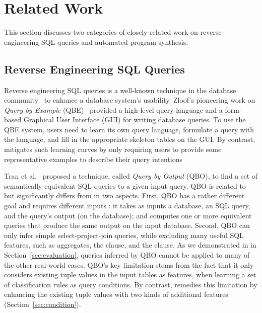
\section{Related Work}
\label{sec:related}

This section discusses two categories
of closely-related work on reverse engineering SQL queries 
and automated program synthesis.


\subsection{Reverse Engineering SQL Queries}

Reverse engineering SQL queries is a well-known technique in the database
community~\cite{Zloof:1975, Tran:2009, DasSarma:2010} to
enhance a database system's usability. 
Zloof's pioneering work on \textit{Query by Example} (QBE)~\cite{Zloof:1975}
provided a high-level query language and a
form-based Graphical User Interface (GUI) for
writing database queries. To use the QBE system, 
users need to learn its own query language,
formulate a query with the language, and fill in
the appropriate skeleton tables on the GUI.
By contrast, \ourtool mitigates such learning curves
by only requiring users to provide some representative
examples to describe their query intentions




Tran et al.~\cite{Tran:2009} proposed a technique,
called \textit{Query by Output} (QBO), 
to find a set of semantically-equivalent SQL queries
to a given input query. QBO is related to but
significantly differs from \ourtool in two aspects.
First, QBO has a rather different goal and requires
different inputs : it takes as inputs a database,
an SQL query, and the query's output (on the database); and computes
one or more equivalent queries that produce the
same output on the input database.
Second, QBO can only infer simple select-project-join queries,
while excluding many useful SQL features, such as aggregates,
the  clause, and the 
clause. As we demonstrated in in Section~\ref{sec:evaluation},
 queries inferred by QBO cannot be applied to many of the other
real-world cases.
QBO's key limitation stems from the fact that it
only considers existing tuple values
in the input tables as features, when learning
a set of classification rules as query conditions. 
By contrast, \ourtool remedies this limitation by enhancing
the existing tuple values with two kinds of
additional features (Section~\ref{sec:condition}).


